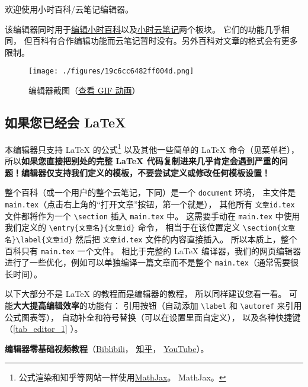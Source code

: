 
欢迎使用小时百科/云笔记编辑器。

该编辑器同时用于\href{https://wuli.wiki/editor/}{编辑小时百科}以及\href{https://wuli.wiki/note/}{小时云笔记}两个板块。 它们的功能几乎相同， 但百科有合作编辑功能而云笔记暂时没有。另外百科对文章的格式会有更多限制。
\begin{figure}[ht]
\centering
\texttt{[image: ./figures/19c6cc6482ff004d.png]}
\caption{编辑器截图（\href{https://wuli.wiki/apps/editor.gif}{查看 GIF 动画}）} \label{fig_editor_3}
\end{figure}

\subsection{如果您已经会 LaTeX}
本编辑器只支持 LaTeX 的公式\footnote{公式渲染和知乎等网站一样使用\href{https://www.mathjax.org/}{MathJax}。 MathJax。} 以及其他一些简单的 LaTeX 命令（见菜单栏）， 所以\textbf{如果您直接把别处的完整 LaTeX 代码复制进来几乎肯定会遇到严重的问题！编辑器仅支持我们定义的模板，不要尝试定义或修改任何模板设置！}

整个百科（或一个用户的整个云笔记，下同）是一个 \verb|document| 环境， 主文件是 \verb|main.tex|（点击右上角的“打开文章”按钮，第一个就是）， 其他所有 \verb|文章id.tex| 文件都将作为一个 \verb|\section| 插入 \verb|main.tex| 中。 这需要手动在 \verb|main.tex| 中使用我们定义的 \verb|\entry{文章名}{文章id}| 命令， 相当于在该位置定义 \verb|\section{文章名}\label{文章id}| 然后把 \verb|文章id.tex| 文件的内容直接插入。 所以本质上，整个百科只有 \verb|main.tex| 一个文件。 相比于完整的 LaTeX 编译器，我们的网页编辑器进行了一些优化，例如可以单独编译一篇文章而不是整个 \verb`main.tex`（通常需要很长时间）。

以下大部分不是 LaTeX 的教程而是编辑器的教程， 所以同样建议您看一看。 可能\textbf{大大提高编辑效率}的功能有： 引用按钮（自动添加 \verb|\label| 和 \verb|\autoref| 来引用公式图表等）， 自动补全和符号替换（可以在设置里面自定义）， 以及各种快捷键（\autoref{tab_editor_1} ）。

\textbf{编辑器零基础视频教程}（\href{https://www.bilibili.com/video/av87698355/}{Biblibili}， \href{https://zhuanlan.zhihu.com/p/105869878}{知乎}， \href{https://www.youtube.com/watch?v=AN2tXNanD9U&t=1s}{YouTube}）。

